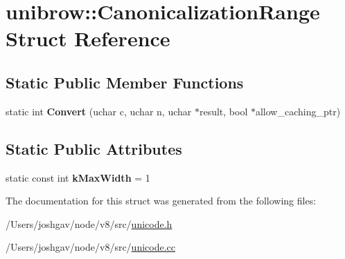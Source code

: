 \hypertarget{structunibrow_1_1_canonicalization_range}{}\section{unibrow\+:\+:Canonicalization\+Range Struct Reference}
\label{structunibrow_1_1_canonicalization_range}
\subsection*{Static Public Member Functions}
\begin{DoxyCompactItemize}
\item 
static int {\bfseries Convert} (uchar c, uchar n, uchar $\ast$result, bool $\ast$allow\+\_\+caching\+\_\+ptr)\hypertarget{structunibrow_1_1_canonicalization_range_a61fdb751fa4e4206a9e649177c219da4}{}\label{structunibrow_1_1_canonicalization_range_a61fdb751fa4e4206a9e649177c219da4}

\end{DoxyCompactItemize}
\subsection*{Static Public Attributes}
\begin{DoxyCompactItemize}
\item 
static const int {\bfseries k\+Max\+Width} = 1\hypertarget{structunibrow_1_1_canonicalization_range_a00a80bc3e640dab47c411eb8876bc872}{}\label{structunibrow_1_1_canonicalization_range_a00a80bc3e640dab47c411eb8876bc872}

\end{DoxyCompactItemize}


The documentation for this struct was generated from the following files\+:\begin{DoxyCompactItemize}
\item 
/\+Users/joshgav/node/v8/src/\hyperlink{unicode_8h}{unicode.\+h}\item 
/\+Users/joshgav/node/v8/src/\hyperlink{unicode_8cc}{unicode.\+cc}\end{DoxyCompactItemize}
